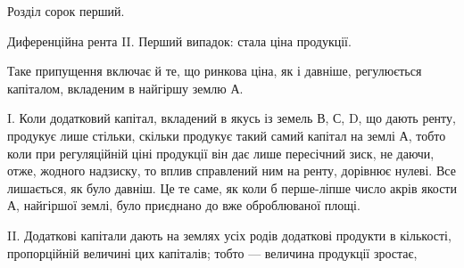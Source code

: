 Розділ сорок перший.

Диференційна рента II. Перший випадок: стала ціна
продукції.

Таке припущення включає й те, що ринкова ціна, як і давніше, регулюється
капіталом, вкладеним в найгіршу землю А.

I. Коли додатковий капітал, вкладений в якусь із земель В, С, D, що
дають ренту, продукує лише стільки, скільки продукує такий самий капітал на
землі А, тобто коли при регуляційній ціні продукції він дає лише пересічний
зиск, не даючи, отже, жодного надзиску, то вплив справлений ним на ренту, дорівнює
нулеві. Все лишається, як було давніш. Це те саме, як коли б перше-ліпше
число акрів якости А, найгіршої землі, було приєднано до вже оброблюваної
площі.

II. Додаткові капітали дають на землях усіх родів додаткові продукти в кількості,
пропорційній величині цих капіталів; тобто — величина продукції зростає,
\parbreak{}  %
